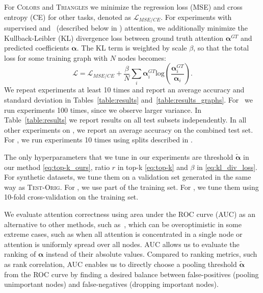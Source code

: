 For \textsc{Colors} and \textsc{Triangles} we minimize the regression loss (MSE) and cross entropy (CE) for other tasks, denoted as $\mathcal{L}_{MSE/CE}$. For experiments with supervised and \wsup~(described below in \secref{\ref{sec:wsup}}) attention, we additionally minimize the Kullback-Leibler (KL) divergence loss between ground truth attention $\mathbf{\alpha}^{GT}$ and predicted coefficients $\mathbf{\alpha}$. The KL term is weighted by scale $\beta$, so that the total loss for some training graph with $N$ nodes becomes:
%
\begin{equation}
\label{eq:kl_div_loss}
\mathcal{L} = \mathcal{L}_{MSE/CE} + \frac{\beta}{N}\sum_i \mathbf{\alpha}_i^{GT} \text{log}(\frac{\mathbf{\alpha}_i^{GT}}{\mathbf{\alpha}_i}).
\end{equation}
%
%
We repeat experiments at least 10 times and report an average accuracy and standard deviation in Tables~\ref{table:results} and~\ref{table:results_graphs}.
For ~we run experiments 100 times, since we observe larger variance.
In Table~\ref{table:results} we report results on all test subsets independently.
In all other experiments on \synthetic, we report an average accuracy on the combined test set.
For \real, we run experiments 10 times using splits described in \secref{\ref{sec:graph_data}}.

The only hyperparameters that we tune in our experiments are threshold $\tilde{\mathbf{\alpha}}$ in our method \eqref{eq:top-k_ours}, ratio $r$ in top-k \eqref{eq:top-k} and $\beta$ in \eqref{eq:kl_div_loss}. For synthetic datasets, we tune them on a validation set generated in the same way as \textsc{Test-Orig}. For \mnist, we use part of the training set. For \real, we tune them using 10-fold cross-validation on the training set.


 We evaluate attention correctness using area under the ROC curve (AUC) as an alternative to other methods, such as~\citep{liu2017attention}, which can be overoptimistic in some extreme cases, such as when all attention is concentrated in a single node or attention is uniformly spread over all nodes. AUC allows us to evaluate the ranking of $\mathbf{\alpha}$ instead of their absolute values. Compared to ranking metrics, such as rank correlation, AUC enables us to directly choose a pooling threshold $\tilde{\mathbf{\alpha}}$ from the ROC curve by finding a desired balance between false-positives (pooling unimportant nodes) and false-negatives (dropping important nodes).

